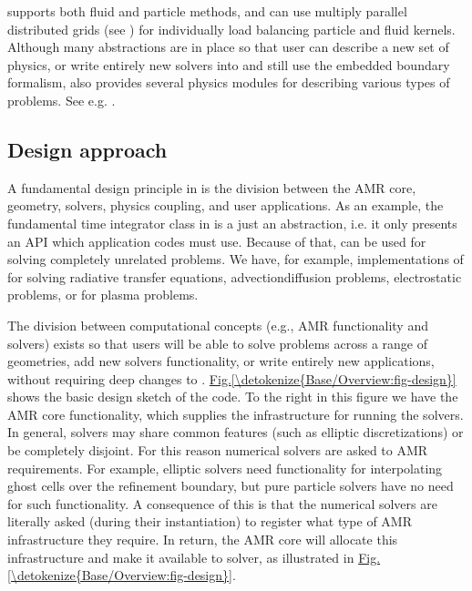 \documentclass[letterpaper,10pt,english]{sphinxmanual}
\begin{document}
 supports both fluid and particle methods, and can use multiply parallel distributed grids (see {\hyperref[\detokenize{Source/Realm:chap-realm}]{}}) for individually load balancing particle and fluid kernels.
Although many abstractions are in place so that user can describe a new set of physics, or write entirely new solvers into  and still use the embedded boundary formalism,  also provides several physics modules for describing various types of problems.
See e.g. {\hyperref[\detokenize{Applications/ImplementedModels:chap-implementedmodels}]{}}.


\subsection{Design approach}
\label{\detokenize{Base/Overview:design-approach}}
A fundamental design principle in  is the division between the AMR core, geometry, solvers, physics coupling, and user applications.
As an example, the fundamental time integrator class  in  is a just an abstraction, i.e. it only presents an API which application codes must use.
Because of that,  can be used for solving completely unrelated problems.
We have, for example, implementations of  for solving radiative transfer equations, advection\sphinxhyphen{}diffusion problems, electrostatic problems, or for plasma problems.

The division between computational concepts (e.g., AMR functionality and solvers) exists so that users will be able to solve problems across a range of geometries, add new solvers functionality, or write entirely new applications, without requiring deep changes to .
\hyperref[\detokenize{Base/Overview:fig-design}]{Fig.\@ \ref{\detokenize{Base/Overview:fig-design}}} shows the basic design sketch of the  code.
To the right in this figure we have the AMR core functionality, which supplies the infrastructure for running the solvers.
In general, solvers may share common features (such as elliptic discretizations) or be completely disjoint.
For this reason numerical solvers are asked to  AMR requirements.
For example, elliptic solvers need functionality for interpolating ghost cells over the refinement boundary, but pure particle solvers have no need for such functionality.
A consequence of this is that the numerical solvers are literally asked (during their instantiation) to register what type of AMR infrastructure they require.
In return, the AMR core will allocate this infrastructure and make it available to solver, as illustrated in \hyperref[\detokenize{Base/Overview:fig-design}]{Fig.\@ \ref{\detokenize{Base/Overview:fig-design}}}.
\end{document}
